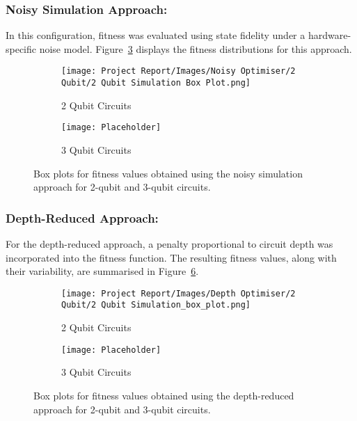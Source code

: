 \documentclass[11pt,a4paper]{article}
\begin{document}
\subsubsection*{Noisy Simulation Approach:}
In this configuration, fitness was evaluated using state fidelity under a hardware-specific noise model. Figure~\ref{fig:noisy_fitness} displays the fitness distributions for this approach.

\begin{figure}[H]
\centering
\begin{subfigure}{.5\textwidth}
  \centering
  \texttt{[image: Project Report/Images/Noisy Optimiser/2 Qubit/2 Qubit Simulation Box Plot.png]}
  \caption{2 Qubit Circuits}
  \label{fig:sub1}
\end{subfigure}%
\begin{subfigure}{.5\textwidth}
  \centering
  \texttt{[image: Placeholder]}
  \caption{3 Qubit Circuits}
  \label{fig:sub2}
\end{subfigure}
\caption{Box plots for fitness values obtained using the noisy simulation approach for 2-qubit and 3-qubit circuits.}
\label{fig:noisy_fitness}
\end{figure}

\subsubsection*{Depth-Reduced Approach:}
For the depth-reduced approach, a penalty proportional to circuit depth was incorporated into the fitness function. The resulting fitness values, along with their variability, are summarised in Figure~\ref{fig:depth_fitness}.

\begin{figure}[H]
\centering
\begin{subfigure}{.5\textwidth}
  \centering
  \texttt{[image: Project Report/Images/Depth Optimiser/2 Qubit/2 Qubit Simulation\_box\_plot.png]}
  \caption{2 Qubit Circuits}
  \label{fig:sub1}
\end{subfigure}%
\begin{subfigure}{.5\textwidth}
  \centering
  \texttt{[image: Placeholder]}
  \caption{3 Qubit Circuits}
  \label{fig:sub2}
\end{subfigure}
\caption{Box plots for fitness values obtained using the depth-reduced approach for 2-qubit and 3-qubit circuits.}
\label{fig:depth_fitness}
\end{figure}
\end{document}
